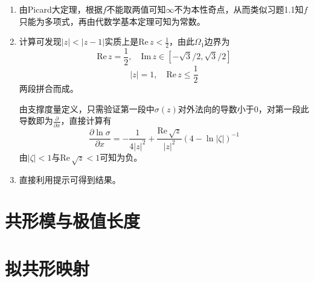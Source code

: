 \documentclass[a4paper,UTF8,fontset=windows,10pt]{ctexart}
\newcommand*{\im}{\mathrm{Im}\,}
\newcommand*{\re}{\mathrm{Re}\,}
\begin{document}
\begin{enumerate}
    \item 由Picard大定理，根据$f$不能取两值可知$\infty$不为本性奇点，从而类似习题1.1知$f$只能为多项式，再由代数学基本定理可知为常数。
    
    \item 计算可发现$|z|<|z-1|$实质上是$\re z<\frac{1}{2}$，由此$\Omega_1$边界为
    $$\re z=\frac{1}{2},\quad \im z\in[-\sqrt3/2,\sqrt3/2]$$
    $$|z|=1,\quad\re z\le\frac{1}{2}$$
    两段拼合而成。

    由支撑度量定义，只需验证第一段中$\sigma(z)$对外法向的导数小于0，对第一段此导数即为$\frac{\partial}{\partial x}$，直接计算有
    $$\frac{\partial\ln\sigma}{\partial x}=-\frac{1}{4|z|^2}+\frac{\re\sqrt{z}}{|z|^2}(4-\ln|\zeta|)^{-1}$$
    由$|\zeta|<1$与$\re\sqrt{z}<1$可知为负。

    \item 直接利用提示可得到结果。
\end{enumerate}

\section{共形模与极值长度}
\section{拟共形映射}
\end{document}
